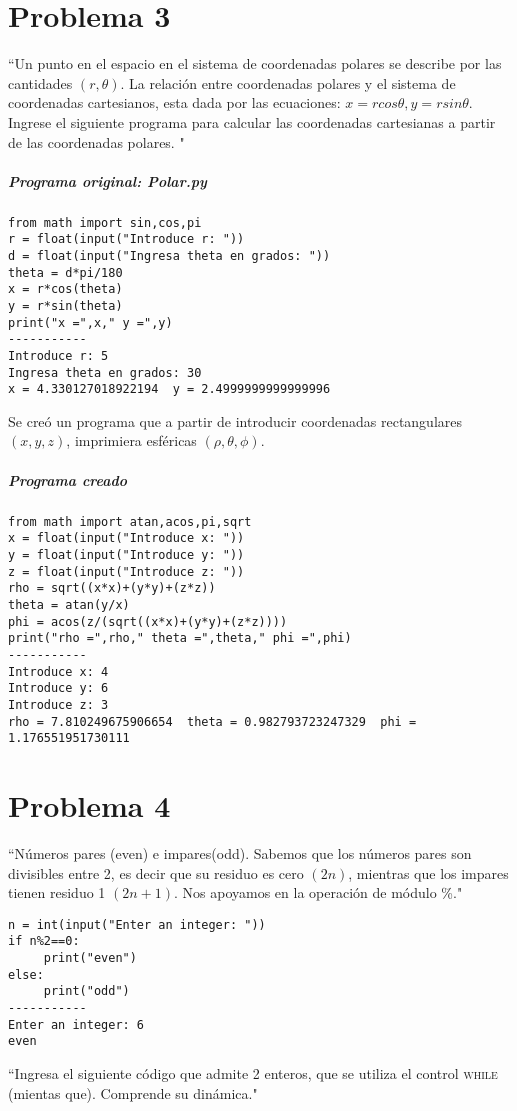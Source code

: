 \documentclass[12pt]{article}
\begin{document}
\section{Problema 3}
``Un punto en el espacio en el sistema de coordenadas polares se describe por las cantidades $(r, \theta)$. La relación entre coordenadas polares y el sistema de coordenadas cartesianos, esta dada por las ecuaciones:  $x = r cos{\theta}, y = r sin{\theta}$. Ingrese el siguiente programa para calcular las coordenadas cartesianas a partir de las coordenadas polares. "

\subparagraph*{Programa original: Polar.py}
\begin{verbatim}
from math import sin,cos,pi
r = float(input("Introduce r: "))
d = float(input("Ingresa theta en grados: "))
theta = d*pi/180
x = r*cos(theta)
y = r*sin(theta)
print("x =",x," y =",y)
-----------
Introduce r: 5
Ingresa theta en grados: 30
x = 4.330127018922194  y = 2.4999999999999996
\end{verbatim}

Se creó un programa que a partir de introducir coordenadas rectangulares $(x,y,z)$, imprimiera esféricas $(\rho,\theta,\phi)$.

\subparagraph*{Programa creado}
\begin{verbatim}
from math import atan,acos,pi,sqrt
x = float(input("Introduce x: "))
y = float(input("Introduce y: "))
z = float(input("Introduce z: "))
rho = sqrt((x*x)+(y*y)+(z*z))
theta = atan(y/x)
phi = acos(z/(sqrt((x*x)+(y*y)+(z*z))))
print("rho =",rho," theta =",theta," phi =",phi)
-----------
Introduce x: 4
Introduce y: 6
Introduce z: 3
rho = 7.810249675906654  theta = 0.982793723247329  phi = 1.176551951730111
\end{verbatim}

\section{Problema 4}
``Números pares (even) e impares(odd). Sabemos que los números pares son divisibles entre 2, es decir que su residuo es cero $(2n)$, mientras que los impares tienen residuo 1 $(2n+1)$. Nos apoyamos en la operación de módulo \%."

\begin{verbatim}
n = int(input("Enter an integer: "))
if n%2==0:
     print("even")
else:
     print("odd")
-----------     
Enter an integer: 6
even
\end{verbatim}

``Ingresa el siguiente código que admite 2 enteros, que se utiliza el control \textsc{while} (mientas que). Comprende su dinámica."
\end{document}
